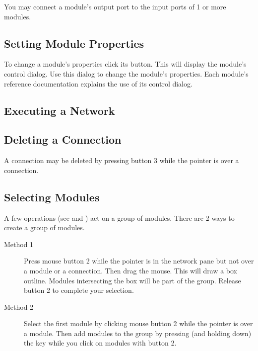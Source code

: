 You may connect a module's output port to the input ports of 1 or more
modules.

\subsection{Setting Module Properties}
\label{sec:setmodprops}

To change a module's properties click its  button.  This will
display the module's control dialog.  Use this dialog to change the
module's properties.  Each module's reference documentation explains the
use of its control dialog.

\subsection{Executing a Network}
\label{sec:executenet}



\subsection{Deleting a Connection}
\label{sec:deleteconnections}

A connection may be deleted by pressing button 3 while the pointer is
over a connection.

\subsection{Selecting Modules}
\label{sec:selectmods}

A few operations (see  and
) act on a group of
modules.  There are 2 ways to create a group of modules.

\begin{description}
\item[Method 1] Press mouse button 2 while the pointer is in the network
  pane but not over a module or a connection.  Then drag the mouse.  This
  will draw a box outline.  Modules intersecting the box will be part of
  the group.  Release button 2 to complete your selection.
\item[Method 2] Select the first module by clicking mouse button 2 while
  the pointer is over a module.  Then add modules to the group by pressing
  (and holding down) the  key while you click on modules
  with button 2.
\end{description}

